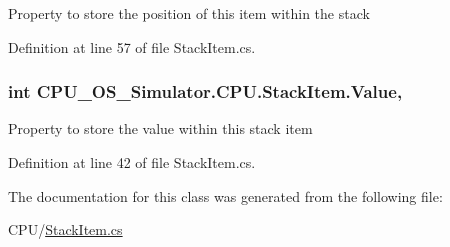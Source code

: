 Property to store the position of this item within the stack 



Definition at line 57 of file Stack\+Item.\+cs.

\hypertarget{class_c_p_u___o_s___simulator_1_1_c_p_u_1_1_stack_item_ac8e518e9111640d56d59efbff2fa3161}{}
\subsubsection[{Value}]{\setlength{\rightskip}{0pt plus 5cm}int C\+P\+U\+\_\+\+O\+S\+\_\+\+Simulator.\+C\+P\+U.\+Stack\+Item.\+Value\hspace{0.3cm}{\ttfamily [get]}, {\ttfamily [set]}}\label{class_c_p_u___o_s___simulator_1_1_c_p_u_1_1_stack_item_ac8e518e9111640d56d59efbff2fa3161}


Property to store the value within this stack item 



Definition at line 42 of file Stack\+Item.\+cs.



The documentation for this class was generated from the following file\+:\begin{DoxyCompactItemize}
\item 
C\+P\+U/\hyperlink{_stack_item_8cs}{Stack\+Item.\+cs}\end{DoxyCompactItemize}
